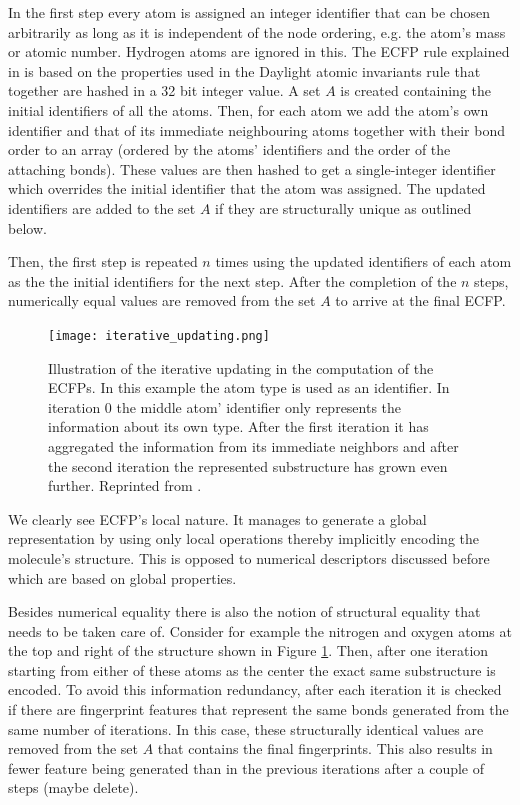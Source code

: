 In the first step every atom is assigned an integer identifier that can be chosen arbitrarily as long as it is independent of the node ordering, e.g. the atom's mass or atomic number. Hydrogen atoms are ignored in this. The ECFP rule explained in \cite{ECFP} is based on the properties used in the Daylight atomic invariants rule \citep{smiles2} that together are hashed in a 32 bit integer value.  A set $A$ is created containing the initial identifiers of all the atoms. Then, for each atom we add the atom's own identifier and that of its immediate neighbouring atoms together with their bond order to an array (ordered by the atoms' identifiers and the order of the attaching bonds). These values are then hashed to get a single-integer identifier which overrides the initial identifier that the atom was assigned. The updated identifiers are added to the set $A$ if they are structurally unique as outlined below.

Then, the first step is repeated $n$ times using the updated identifiers of each atom as the the initial identifiers for the next step. After the completion of the $n$ steps, numerically equal values are removed from the set $A$ to arrive at the final ECFP.
\begin{figure}[h]
	\centering 
	\texttt{[image: iterative\_updating.png]}
	\caption{Illustration of the iterative updating in the computation of the ECFPs. In this example the atom type is used as an identifier. In iteration 0 the middle atom' identifier only represents the information about its own type. After the first iteration it has aggregated the information from its immediate neighbors and after the second iteration the represented substructure has grown even further. Reprinted from \cite{ECFP}. }
	\label{fig:iteration_ECFP}
\end{figure}
We clearly see ECFP's local nature. It manages to generate a global representation by using only local operations thereby implicitly encoding the molecule's structure. This is opposed to numerical descriptors discussed before which are based on global properties. 

Besides numerical equality there is also the notion of structural equality that needs to be taken care of. Consider for example the nitrogen and oxygen atoms at the top and right of the structure shown in Figure \ref{fig:iteration_ECFP}. Then, after one iteration starting from either of these atoms as the center the exact same substructure is encoded. To avoid this information redundancy, after each iteration it is checked if there are fingerprint features that represent the same bonds generated from the same number of iterations. In this case, these structurally identical values are removed from the set $A$ that contains the final fingerprints. This also results in fewer feature being generated than in the previous iterations after a couple of steps (maybe delete).


